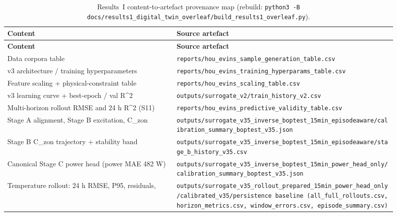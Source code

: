 \documentclass[11pt,a4paper]{article}
\begin{document}
\begin{longtable}{@{}p{0.40\linewidth} p{0.52\linewidth}@{}}
\caption{Results~I content-to-artefact provenance map (rebuild: \texttt{python3 -B docs/results1\_digital\_twin\_overleaf/build\_results1\_overleaf.py}).}\label{tab:prov-r1}\\
\textbf{Content} & \textbf{Source artefact}\\ \midrule \endfirsthead
\textbf{Content} & \textbf{Source artefact}\\ \midrule \endhead
Data corpora table & \texttt{reports/\allowbreak hou\_\allowbreak evins\_\allowbreak sample\_\allowbreak generation\_\allowbreak table.csv} \\
v3 architecture / training hyperparameters & \texttt{reports/\allowbreak hou\_\allowbreak evins\_\allowbreak training\_\allowbreak hyperparams\_\allowbreak table.csv} \\
Feature scaling + physical-constraint table & \texttt{reports/\allowbreak hou\_\allowbreak evins\_\allowbreak scaling\_\allowbreak table.csv} \\
v3 learning curve + best-epoch / val R\textasciicircum{}2 & \texttt{outputs/\allowbreak surrogate\_\allowbreak v2/\allowbreak train\_\allowbreak history\_\allowbreak v2.csv} \\
Multi-horizon rollout RMSE and 24 h R\textasciicircum{}2 (S11) & \texttt{reports/\allowbreak hou\_\allowbreak evins\_\allowbreak predictive\_\allowbreak validity\_\allowbreak table.csv} \\
Stage A alignment, Stage B excitation, C\_zon & \texttt{outputs/\allowbreak surrogate\_\allowbreak v35\_\allowbreak inverse\_\allowbreak boptest\_\allowbreak 15min\_\allowbreak episodeaware/\allowbreak calibration\_\allowbreak summary\_\allowbreak boptest\_\allowbreak v35.json} \\
Stage B C\_zon trajectory + stability band & \texttt{outputs/\allowbreak surrogate\_\allowbreak v35\_\allowbreak inverse\_\allowbreak boptest\_\allowbreak 15min\_\allowbreak episodeaware/\allowbreak stage\_\allowbreak b\_\allowbreak history\_\allowbreak v35.csv} \\
Canonical Stage C power head (power MAE 482 W) & \texttt{outputs/\allowbreak surrogate\_\allowbreak v35\_\allowbreak inverse\_\allowbreak boptest\_\allowbreak 15min\_\allowbreak power\_\allowbreak head\_\allowbreak only/\allowbreak calibration\_\allowbreak summary\_\allowbreak boptest\_\allowbreak v35.json} \\
Temperature rollout: 24 h RMSE, P95, residuals, & \texttt{outputs/\allowbreak surrogate\_\allowbreak v35\_\allowbreak rollout\_\allowbreak prepared\_\allowbreak 15min\_\allowbreak power\_\allowbreak head\_\allowbreak only/\allowbreak calibrated\_\allowbreak v35/\allowbreak  persistence baseline                                  (all\_\allowbreak full\_\allowbreak rollouts.csv, horizon\_\allowbreak metrics.csv, window\_\allowbreak errors.csv, episode\_\allowbreak summary.csv)} \\

\end{longtable}
\end{document}
